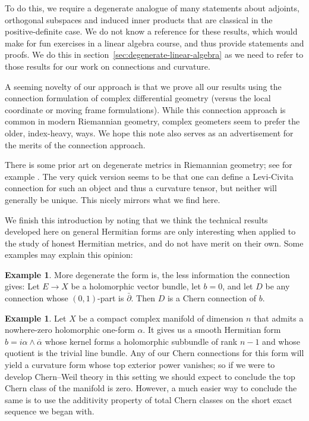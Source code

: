 \documentclass[10pt,a4paper]{amsart}
\theoremstyle{definition}
\newtheorem{exam}[theo]{Example}
\def\ov#1{\overline{#1}}
\begin{document}
To do this, we require a degenerate analogue of many statements about adjoints, orthogonal subspaces and induced inner products that are classical in the positive-definite case. We do not know a reference for these results, which would make for fun exercises in a linear algebra course, and thus provide statements and proofs. We do this in section~\ref{sec:degenerate-linear-algebra} as we need to refer to those results for our work on connections and curvature.

A seeming novelty of our approach is that we prove all our results using the connection formulation of complex differential geometry (versus the local coordinate or moving frame formulations). While this connection approach is common in modern Riemannian geometry, complex geometers seem to prefer the older, index-heavy, ways. We hope this note also serves as an advertisement for the merits of the connection approach.

There is some prior art on degenerate metrics in Riemannian geometry; see for example \cite{bel1975degenerate,stoica2011cartan,stoica2014singular}.
The very quick version seems to be that one can define a Levi-Civita connection for such an object and thus a curvature tensor, but neither will generally be unique.
This nicely mirrors what we find here.


We finish this introduction by noting that we think the technical results developed here on general Hermitian forms are only interesting when applied to the study of honest Hermitian metrics, and do not have merit on their own.
Some examples may explain this opinion:


\begin{exam}
More degenerate the form is, the less information the connection gives:
Let $E \to X$ be a holomorphic vector bundle, let $b = 0$, and let $D$ be any connection whose $(0,1)$-part is $\bar\partial$. Then $D$ is a Chern connection of $b$.
\end{exam}


\begin{exam}
Let $X$ be a compact complex manifold of dimension $n$
that admits a nowhere-zero holomorphic one-form $\alpha$.
It  gives us a smooth Hermitian form $b = i \alpha \wedge \ov \alpha$ whose kernel forms a holomorphic subbundle of rank $n-1$ and whose quotient is the trivial line bundle.
Any of our Chern connections for this form will yield a curvature form whose top exterior power vanishes; so if we were to develop Chern--Weil theory in this setting we should expect to conclude the top Chern class of the manifold is zero.
However, a much easier way to conclude the same is to use the additivity property of total Chern classes on the short exact sequence we began with.
\end{exam}
\end{document}
